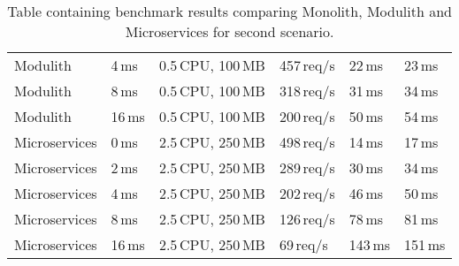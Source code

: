 \begin{table}
\begin{tabular}{ |p{3cm}||p{1.2cm}|p{3cm}|p{1.5cm}|p{1.5cm}|p{1.5cm}| }
        Modulith      & 4\,ms         & 0.5\,CPU, 100\,MB & 457\,req/s & 22\,ms  & 23\,ms    \\ %
        Modulith      & 8\,ms         & 0.5\,CPU, 100\,MB & 318\,req/s & 31\,ms  & 34\,ms    \\ %
        Modulith      & 16\,ms        & 0.5\,CPU, 100\,MB & 200\,req/s & 50\,ms  & 54\,ms    \\ %
        \rowcolor{Gray}
        Microservices & 0\,ms         & 2.5\,CPU, 250\,MB & 498\,req/s & 14\,ms  & 17\,ms    \\ %
        Microservices & 2\,ms         & 2.5\,CPU, 250\,MB & 289\,req/s & 30\,ms  & 34\,ms    \\ %
        Microservices & 4\,ms         & 2.5\,CPU, 250\,MB & 202\,req/s & 46\,ms  & 50\,ms    \\ %
        Microservices & 8\,ms         & 2.5\,CPU, 250\,MB & 126\,req/s & 78\,ms  & 81\,ms    \\ %
        Microservices & 16\,ms        & 2.5\,CPU, 250\,MB & 69\,req/s  & 143\,ms & 151\,ms   \\ %
        \hline
    \end{tabular}
    \caption{Table containing benchmark results comparing Monolith, Modulith and Microservices for second scenario.\label{table:benchmark_scenario2_v2}}
\end{table}








% 




